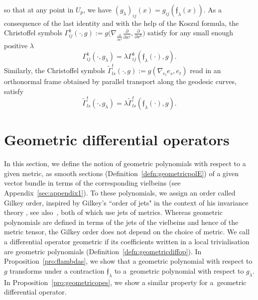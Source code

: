 \documentclass[10pt,a4paper]{amsart}
\numberwithin{equation}{section}
\theoremstyle{definition}
\begin{document}
so that at any point in $U_p$, we have
$\left(g_\lambda\right)_{ij}(x)=g_{ij}(\mathfrak{f}_\lambda(x)).$ As a consequence of the last identity and with the help of the Koszul formula, the Christoffel symbols $\Gamma_{i j}^k (\cdot, g):=g\bigl(\nabla_{\frac{\partial}{\partial x^i}} \frac{\partial}{\partial x^j}, \frac{\partial}{\partial x^k}\bigr)$ satisfy for any small enough positive $\lambda$
\begin{equation*}
 \Gamma_{i j}^k (\cdot, g_\lambda) =\lambda \Gamma_{i j}^k (\mathfrak{f}_\lambda(\cdot),g).
 \end{equation*}
Similarly, the Christoffel symbols $\tilde\Gamma_{ls}^t(\cdot,g) :=g(\nabla_{e_l}e_s,e_t)$ read in an orthonormal frame obtained by parallel transport along the geodesic curves, satisfy
\begin{equation}\label{eq:symbchriglamdabis}
\tilde\Gamma_{ls}^t(\cdot,g_\lambda) =\lambda \tilde\Gamma_{ls}^t( \mathfrak{f}_\lambda(\cdot), g).
\end{equation}

\section{Geometric differential operators}
In this section, we define the notion of geometric polynomials with respect to a given metric, as smooth sections (Definition~\ref{defn:geometricpolE}) of a given vector bundle in terms of the corresponding vielbeins (see Appendix~\ref{sec:appendix1}). To these polynomials, we assign an order called Gilkey order, inspired by Gilkey's ``order of jets" in the context of his invariance theory \cite[Section~2.4]{G}, see also~\mbox{\cite[Section~3]{MP}}, both of which use jets of metrics. Whereas geometric polynomials are defined in terms of the jets of the vielbeins and hence of the metric tensor, the Gilkey order does not depend on the choice of metric. We call a differential operator geometric if its coefficients written in a local trivialisation are geometric polynomials (Definition~\ref{defn:geometricdiffop}). In Proposition~\ref{pro:flambdas}, we show that a geometric polynomial with respect to $g$ transforms under a contraction $\mathfrak f_\lambda$ to a~geometric polynomial with respect to $g_\lambda$. In Proposition~\ref{pro:geometricopes}, we show a similar property for a~geometric differential operator.
\end{document}
